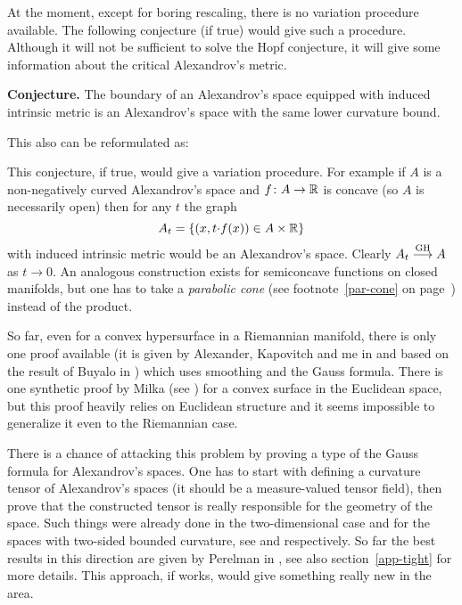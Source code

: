\documentclass{article}
\begin{document}
At the moment, except for boring rescaling, there is no variation procedure available.
The following conjecture (if true) would give such a procedure.
Although it will not be sufficient to solve the Hopf conjecture, it will give some information about the critical Alexandrov's metric.

\begin{thm}{\bf Conjecture.}\label{conj:bry}
The boundary of an Alexandrov's space equipped with induced intrinsic metric is an
Alexandrov's space with the same lower curvature bound.
\end{thm}

This also can be reformulated as:

\bigskip


\bigskip

This conjecture, if true, would give a variation procedure. 
For example if $A$ is a non-negatively curved Alexandrov's space and $f\colon A\to\mathbb{R}$ is concave (so $A$ is necessarily open) then for any $t$ the graph
$$A_t
=
\{(x,t{\cdot} f(x))\in A\times\mathbb{R}\}$$
with induced intrinsic metric would be an Alexandrov's space. 
Clearly $A_t\GHto A$ as $t\to0$. 
An analogous construction exists for semiconcave functions on closed manifolds, but
one has to take a \emph{parabolic cone} 
(see footnote~\ref{par-cone} on page~\pageref{par-cone}) 
instead of the product.


So far, even for a convex hypersurface in a Riemannian manifold, there is only one proof available (it is given by Alexander, Kapovitch and me in \cite{akp} 
and based on the result of Buyalo in \cite{buyalo:convex-surface}) 
which uses smoothing and the Gauss formula. 
There is one synthetic proof by Milka
(see \cite{milka-conv}) for a convex surface in the Euclidean space, but this proof heavily relies on Euclidean
structure and it seems impossible to generalize it even to the Riemannian case.

There is a chance of attacking this problem by proving a type of the Gauss formula for
Alexandrov's spaces. 
One has to start with defining a curvature tensor of Alexandrov's spaces (it
should be a measure-valued tensor field), then prove that the constructed tensor is really responsible for the geometry of the space. 
Such things were already done in the two-dimensional case
and for the spaces with two-sided  bounded curvature,
see \cite{reshetnyak:curvature} and
\cite{nikolaev:curvature} respectively.
So far the best results in this direction are given by Perelman in \cite{perelman:DC}, see also section~\ref{app-tight} for more details.
This approach, if works, would give something really new in the area.
\end{document}
